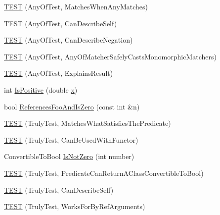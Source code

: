 \begin{DoxyCompactItemize}
\item 
\mbox{\hyperlink{namespacetesting_1_1gmock__matchers__test_a4949d40a1ac77182274189c21848af00}{T\+E\+ST}} (Any\+Of\+Test, Matches\+When\+Any\+Matches)
\item 
\mbox{\hyperlink{namespacetesting_1_1gmock__matchers__test_a00bd490bf974b3f3485a1b0fde9fa490}{T\+E\+ST}} (Any\+Of\+Test, Can\+Describe\+Self)
\item 
\mbox{\hyperlink{namespacetesting_1_1gmock__matchers__test_acc5e849e0765f00a48581e9480f3c8e2}{T\+E\+ST}} (Any\+Of\+Test, Can\+Describe\+Negation)
\item 
\mbox{\hyperlink{namespacetesting_1_1gmock__matchers__test_a8fb1598253450afeb0440682cd23999e}{T\+E\+ST}} (Any\+Of\+Test, Any\+Of\+Matcher\+Safely\+Casts\+Monomorphic\+Matchers)
\item 
\mbox{\hyperlink{namespacetesting_1_1gmock__matchers__test_ad4c09014fce6029575e2c337cde85bdf}{T\+E\+ST}} (Any\+Of\+Test, Explains\+Result)
\item 
int \mbox{\hyperlink{namespacetesting_1_1gmock__matchers__test_a70e728cf67d0224c3ebb9eb8959cc39d}{Is\+Positive}} (double \mbox{\hyperlink{_obj__test_2lib_2googletest-master_2googlemock_2test_2gmock-matchers__test_8cc_a6150e0515f7202e2fb518f7206ed97dc}{x}})
\item 
bool \mbox{\hyperlink{namespacetesting_1_1gmock__matchers__test_abdce9daf2e3d3721d68f76680129f03b}{References\+Foo\+And\+Is\+Zero}} (const int \&n)
\item 
\mbox{\hyperlink{namespacetesting_1_1gmock__matchers__test_ab7761562a8ffea67a485f3f649f6430a}{T\+E\+ST}} (Truly\+Test, Matches\+What\+Satisfies\+The\+Predicate)
\item 
\mbox{\hyperlink{namespacetesting_1_1gmock__matchers__test_ab3e259f3ae45e199474d7c6d554852f0}{T\+E\+ST}} (Truly\+Test, Can\+Be\+Used\+With\+Functor)
\item 
Convertible\+To\+Bool \mbox{\hyperlink{namespacetesting_1_1gmock__matchers__test_a248045bc57c8bad87b7d185b5c292f60}{Is\+Not\+Zero}} (int number)
\item 
\mbox{\hyperlink{namespacetesting_1_1gmock__matchers__test_a24529fd7834d272009af74106422fe54}{T\+E\+ST}} (Truly\+Test, Predicate\+Can\+Return\+A\+Class\+Convertible\+To\+Bool)
\item 
\mbox{\hyperlink{namespacetesting_1_1gmock__matchers__test_af474a9719e614d521c71bdf7c39f6a7a}{T\+E\+ST}} (Truly\+Test, Can\+Describe\+Self)
\item 
\mbox{\hyperlink{namespacetesting_1_1gmock__matchers__test_ae702d436c52bd37fe3e8d405d7e6a691}{T\+E\+ST}} (Truly\+Test, Works\+For\+By\+Ref\+Arguments)

\end{DoxyCompactItemize}
